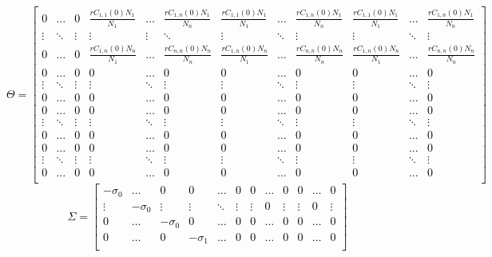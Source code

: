 \textcolor{black}{
\begin{equation}
    \Theta = 
\begin{bmatrix}
0 & \dots & 0  & \frac{r C_{1,1}(0)N_1}{N_1} & \dots &\frac{r C_{1,n}(0)N_1}{N_n} &  \frac{r C_{1,1}(0)N_1}{N_1} & \dots & \frac{r C_{1,n}(0)N_1}{N_n} &  \frac{r C_{1,1}(0)N_1}{N_1} & \dots & \frac{r C_{1,n}(0)N_1}{N_n}  \\
\vdots & \ddots  & \vdots & \vdots & \vdots & \ddots  & \vdots & \ddots & \vdots  & \vdots & \ddots & \vdots \\
0 & \dots & 0 & \frac{r C_{1,n}(0)N_n}{N_1} & \dots & \frac{r C_{n,n}(0)N_n}{N_n}  & \frac{ r C_{1,n}(0)N_n}{N_1} & \dots & \frac{r C_{n,n}(0)N_n}{N_n} & \frac{ r C_{1,n}(0)N_n}{N_1} & \dots & \frac{r C_{n,n}(0)N_n}{N_n} \\ 
0 & \dots & 0  & 0 & \dots & 0  & 0 & \dots & 0 & 0 & \dots & 0  \\
\vdots & \ddots & \vdots & \vdots &  \ddots & \vdots & \vdots & \ddots & \vdots & \vdots & \ddots & \vdots\\
0 & \dots & 0  & 0 & \dots &  0  & 0 & \dots & 0  & 0 & \dots & 0 \\ 
0 & \dots & 0  &  0 & \dots & 0  & 0 & \dots & 0  & 0 & \dots & 0 \\
\vdots & \ddots & \vdots & \vdots & \ddots & \vdots & \vdots & \ddots & \vdots  & \vdots & \ddots & \vdots\\
0 & \dots & 0  & 0 & \dots & 0  & 0 & \dots &  0 & 0 & \dots &  0 \\ 
0 & \dots & 0  &  0 & \dots & 0  & 0 & \dots & 0  & 0 & \dots & 0 \\
\vdots & \ddots & \vdots & \vdots & \ddots & \vdots & \vdots & \ddots & \vdots  & \vdots & \ddots & \vdots\\
0 & \dots & 0  & 0 & \dots & 0  & 0 & \dots &  0 & 0 & \dots &  0 \\ 
\end{bmatrix}
\label{Teqn}
\end{equation}
\begin{equation}
    \Sigma = 
\begin{bmatrix}
-\sigma_0 & \dots & 0  &  0 &\dots & 0  & 0 & \dots & 0   & 0 & \dots & 0  \\
\vdots & -\sigma_0  & \vdots & \vdots &  \ddots & \vdots & \vdots &0 & \vdots & \vdots &0 & \vdots\\
0 & \dots &-\sigma_0  & 0 & \dots & 0 & 0 & \dots & 0 & 0 & \dots & 0  \\ 
0 & \dots & 0 & -\sigma_1 & \dots & 0 & 0 & \dots & 0  & 0 & \dots & 0  \\

\end{bmatrix}
\end{equation}}
